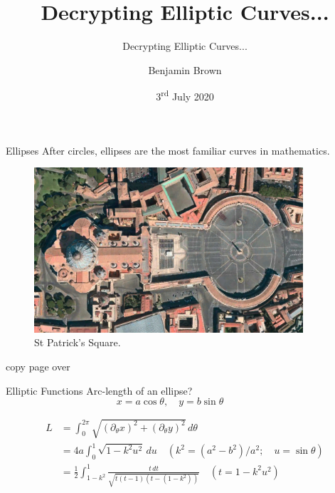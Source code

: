 \documentclass{beamer}
\title[]{Decrypting Elliptic Curves...}
\subtitle{Decrypting Elliptic Curves...}
\author{Benjamin Brown}
\date{3\textsuperscript{rd} July 2020}
\begin{document}
\begin{frame}
  \titlepage
\end{frame}

\begin{frame}[t]{Ellipses}
	After circles, ellipses are the most familiar curves in mathematics.
	\begin{figure}[h]
		\centering
		\includegraphics[width=10cm]{st-patricks-square}
		\caption{St Patrick's Square.}
	\end{figure}
\end{frame}

\begin{frame}	
	copy page over
\end{frame}

\begin{frame}[t]{Elliptic Functions}
	Arc-length of an ellipse?
\begin{equation*}
	x = a\cos\theta,\quad y=b\sin\theta\quad \quad \quad 
\end{equation*}
	
\begin{equation*}
	\begin{split}
		L &= \int_{0}^{2\pi} \sqrt{ ( \partial_{\theta}x )^{2} + ( \partial_{\theta}y )^{2} }\, d\theta \\
		&= 4a \int_{0}^{1} \sqrt{ 1 - k^{2} u^{2} }\, du \quad (k^{2} = (a^{2} - b^{2})/a^{2};\quad u = \sin\theta ) \\
		&= \frac{1}{2} \int_{1-k^{2}}^{1} \frac{t\, dt}{\sqrt{t(t-1)(t - (1-k^{2}))}}\quad (t = 1 - k^{2}u^{2})
	\end{split}
\end{equation*}	
\end{frame}
\end{document}
